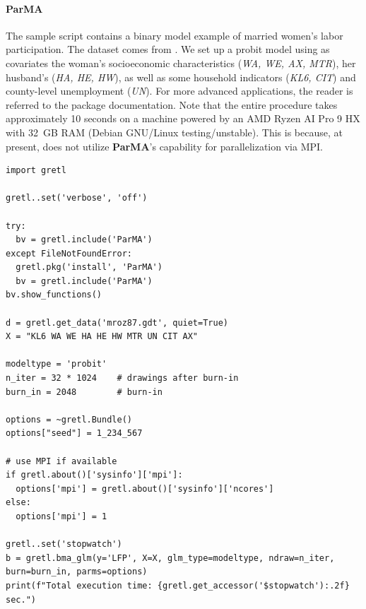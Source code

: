\paragraph{ParMA} The sample script contains a binary
model example of married women's labor participation.
The dataset comes from \cite{mroz87}. We set up a probit
model using as covariates the woman's socioeconomic
characteristics (\textit{WA, WE, AX, MTR}), her husband's
(\textit{HA, HE, HW}), as well as some household indicators
(\textit{KL6, CIT}) and county-level unemployment (\textit{UN}).
For more advanced applications, the reader is referred
to the package documentation. Note that the entire procedure
takes approximately 10 seconds on a machine powered by an AMD Ryzen
AI Pro 9 HX with 32~GB RAM (Debian GNU/Linux testing/unstable).
This is because, at present, \gretlpy does not
utilize \textbf{ParMA}'s capability for parallelization
via MPI.
\begin{lstlisting}[style=pythonstylefoot]
import gretl

gretl..set('verbose', 'off')

try:
  bv = gretl.include('ParMA')
except FileNotFoundError:
  gretl.pkg('install', 'ParMA')
  bv = gretl.include('ParMA')
bv.show_functions()

d = gretl.get_data('mroz87.gdt', quiet=True)
X = "KL6 WA WE HA HE HW MTR UN CIT AX"

modeltype = 'probit'
n_iter = 32 * 1024    # drawings after burn-in
burn_in = 2048        # burn-in

options = ~gretl.Bundle()
options["seed"] = 1_234_567

# use MPI if available
if gretl.about()['sysinfo']['mpi']:
  options['mpi'] = gretl.about()['sysinfo']['ncores']
else:
  options['mpi'] = 1

gretl..set('stopwatch')
b = gretl.bma_glm(y='LFP', X=X, glm_type=modeltype, ndraw=n_iter, burn=burn_in, parms=options)
print(f"Total execution time: {gretl.get_accessor('$stopwatch'):.2f} sec.")
\end{lstlisting}%

